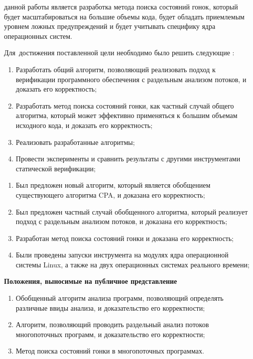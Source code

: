 
{\aim} данной работы является разработка метода поиска состояний гонок, который будет масштабироваться на большие объемы кода, будет обладать приемлемым уровнем ложных предупреждений и будет учитывать специфику ядра операционных систем.

Для~достижения поставленной цели необходимо было решить следующие {\tasks}:
\begin{enumerate}
  \item Разработать общий алгоритм, позволяющий реализовать подход к верификации программного обеспечения с раздельным анализом потоков, и доказать его корректность;
  \item Разработать метод поиска состояний гонки, как частный случай общего алгоритма, который может эффективно применяться к большим объемам исходного кода, и доказать его корректность;
  \item Реализовать разработанные алгоритмы;
  \item Провести эксперименты и сравнить результаты с другими инструментами статической верификации;
\end{enumerate}

{\novelty}
\begin{enumerate}
  \item Был предложен новый алгоритм, который является обобщением существующего алгоритма CPA, и доказана его корректность;
  \item Был предложен частный случай обобщенного алгоритма, который реализует подход с раздельным анализом потоков, и доказана его корректность;
  \item Разработан метод поиска состояний гонки и доказана его корректность;
  \item Были проведены запуски инструмента на модулях ядра операционной системы Linux, а также на двух операционных системах реального времени;
\end{enumerate}



\textbf{Положения, выносимые на публичное представление}
\begin{enumerate}
  \item Обобщенный алгоритм анализа программ, позволяющий определять различные ввиды анализа, и доказательство его корректности;
  \item Алгоритм, позволяющий проводить раздельный анализ потоков многопоточных программ, и доказательство его корректности;
  \item Метод поиска состояний гонки в многопоточных программах.
\end{enumerate}

